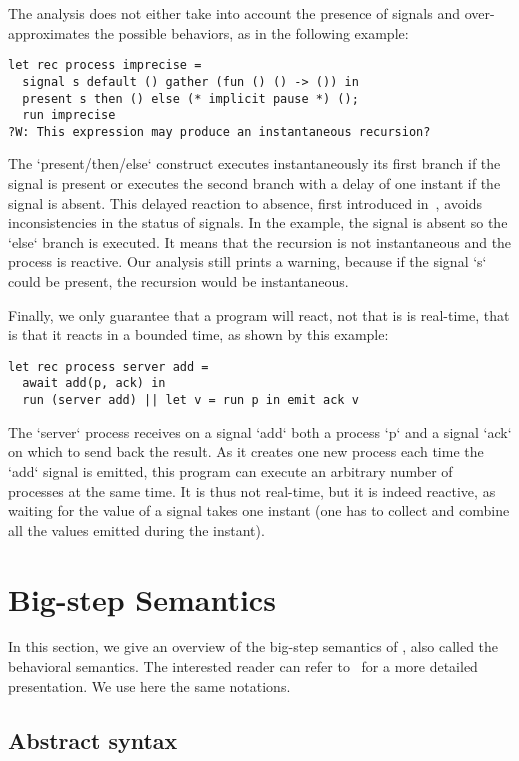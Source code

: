 \documentclass[9pt,preprint]{sigplanconf}
\begin{document}
The analysis does not either take into account the presence of signals and over-approximates the possible behaviors, as in the following example:
\begin{lstlisting}
let rec process imprecise =
  signal s default () gather (fun () () -> ()) in
  present s then () else (* implicit pause *) ();
  run imprecise
?W: This expression may produce an instantaneous recursion?
\end{lstlisting}
%
The `present/then/else` construct executes instantaneously its first branch if the signal is present or executes the second branch with a delay of one instant if the signal is absent. This delayed reaction to absence, first introduced in~\cite{Boussinot:1991}, avoids inconsistencies in the status of signals. In the example, the signal is absent so the `else` branch is executed. It means that the recursion is not instantaneous and the process is reactive. Our analysis still prints a warning, because if the signal `s` could be present, the recursion would be instantaneous.

Finally, we only guarantee that a program will react, not that is is real-time, that is that it reacts in a bounded time, as shown by this example:
\begin{lstlisting}
let rec process server add =
  await add(p, ack) in
  run (server add) || let v = run p in emit ack v
\end{lstlisting}
%
The `server` process receives on a signal `add` both a process `p` and a signal `ack` on which to send back the result. As it creates one new process each time the `add` signal is emitted, this program can execute an arbitrary number of processes at the same time. It is thus not real-time, but it is indeed reactive, as waiting for the value of a signal takes one instant (one has to collect and combine all the values emitted during the instant).

\section{Big-step Semantics}
\label{sec:semantics}

In this section, we give an overview of the big-step semantics of \rml{}, also called the behavioral semantics. The interested reader can refer to~\cite{Mandel:2005} for a more detailed presentation. We use here the same notations.

\subsection{Abstract syntax}
\end{document}
